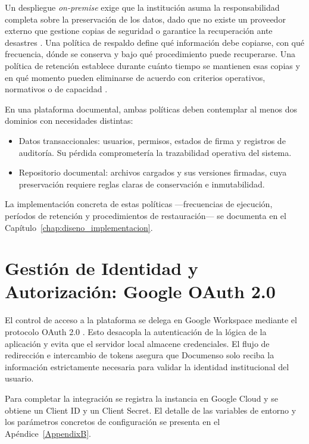 Un despliegue \textit{on-premise} exige que la institución asuma la responsabilidad completa sobre la preservación de los datos, dado que no existe un proveedor externo que gestione copias de seguridad o garantice la recuperación ante desastres \cite{techtarget_retention}. Una política de respaldo define qué información debe copiarse, con qué frecuencia, dónde se conserva y bajo qué procedimiento puede recuperarse. Una política de retención establece durante cuánto tiempo se mantienen esas copias y en qué momento pueden eliminarse de acuerdo con criterios operativos, normativos o de capacidad \cite{techtarget_retention,pgbarman_retention}.

En una plataforma documental, ambas políticas deben contemplar al menos dos dominios con necesidades distintas:

\begin{itemize}
    \item Datos transaccionales: usuarios, permisos, estados de firma y registros de auditoría. Su pérdida comprometería la trazabilidad operativa del sistema.
    \item Repositorio documental: archivos cargados y sus versiones firmadas, cuya preservación requiere reglas claras de conservación e inmutabilidad.
\end{itemize}

La implementación concreta de estas políticas ---frecuencias de ejecución, períodos de retención y procedimientos de restauración--- se documenta en el Capítulo~\ref{chap:diseno_implementacion}.

\section{Gestión de Identidad y Autorización: Google OAuth 2.0}
\label{sec:identidad}

El control de acceso a la plataforma se delega en Google Workspace mediante el protocolo OAuth 2.0 \cite{oauth2}. Esto desacopla la autenticación de la lógica de la aplicación y evita que el servidor local almacene credenciales. El flujo de redirección e intercambio de tokens asegura que Documenso solo reciba la información estrictamente necesaria para validar la identidad institucional del usuario.

Para completar la integración se registra la instancia en Google Cloud y se obtiene un Client ID y un Client Secret. El detalle de las variables de entorno y los parámetros concretos de configuración se presenta en el Apéndice~\ref{AppendixB}.


